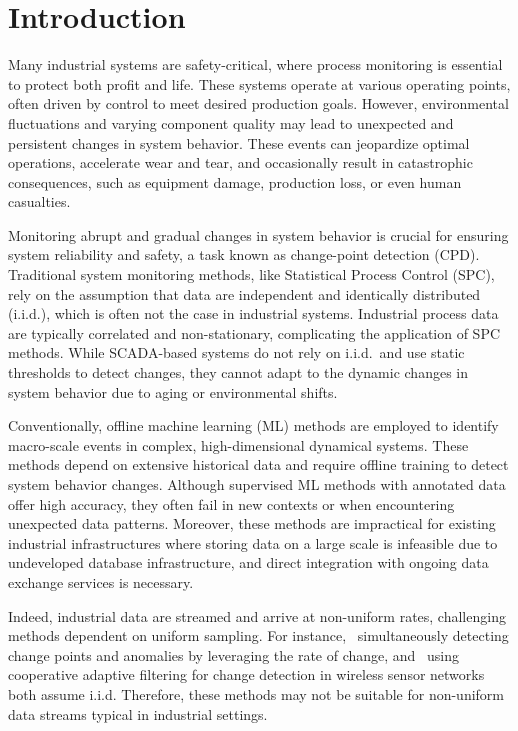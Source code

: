 \section{Introduction}\label{sec:introduction}
Many industrial systems are safety-critical, where process monitoring is essential to protect both profit and life. These systems operate at various operating points, often driven by control to meet desired production goals. However, environmental fluctuations and varying component quality may lead to unexpected and persistent changes in system behavior. These events can jeopardize optimal operations, accelerate wear and tear, and occasionally result in catastrophic consequences, such as equipment damage, production loss, or even human casualties.

Monitoring abrupt and gradual changes in system behavior is crucial for ensuring system reliability and safety, a task known as change-point detection (CPD). Traditional system monitoring methods, like Statistical Process Control (SPC), rely on the assumption that data are independent and identically distributed (i.i.d.), which is often not the case in industrial systems. Industrial process data are typically correlated and non-stationary, complicating the application of SPC methods. While SCADA-based systems do not rely on i.i.d.\ and use static thresholds to detect changes, they cannot adapt to the dynamic changes in system behavior due to aging or environmental shifts.

Conventionally, offline machine learning (ML) methods are employed to identify macro-scale events in complex, high-dimensional dynamical systems. These methods depend on extensive historical data and require offline training to detect system behavior changes. Although supervised ML methods with annotated data offer high accuracy, they often fail in new contexts or when encountering unexpected data patterns. Moreover, these methods are impractical for existing industrial infrastructures where storing data on a large scale is infeasible due to undeveloped database infrastructure, and direct integration with ongoing data exchange services is necessary.

Indeed, industrial data are streamed and arrive at non-uniform rates, challenging methods dependent on uniform sampling. For instance,~\cite{Liu2023} simultaneously detecting change points and anomalies by leveraging the rate of change, and~\cite{Fathy2019} using cooperative adaptive filtering for change detection in wireless sensor networks both assume i.i.d. Therefore, these methods may not be suitable for non-uniform data streams typical in industrial settings.

